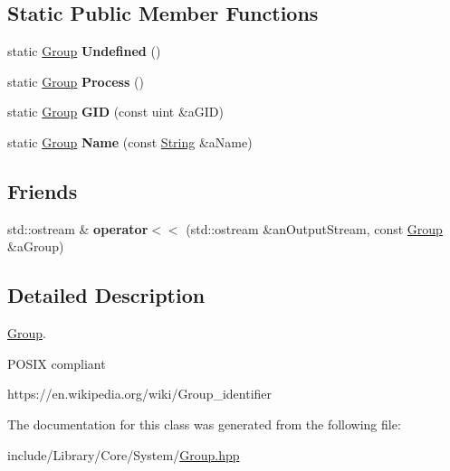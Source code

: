 \subsection*{Static Public Member Functions}
\begin{DoxyCompactItemize}
\item 
\mbox{\label{classlibrary_1_1core_1_1system_1_1_group_a50c939824e28f2ce5a0ff7ab253689e4}} 
static \hyperlink{classlibrary_1_1core_1_1system_1_1_group}{Group} {\bfseries Undefined} ()
\item 
\mbox{\label{classlibrary_1_1core_1_1system_1_1_group_a90961dc55447dca842c5f0ea43778c18}} 
static \hyperlink{classlibrary_1_1core_1_1system_1_1_group}{Group} {\bfseries Process} ()
\item 
\mbox{\label{classlibrary_1_1core_1_1system_1_1_group_a6f6e71dd112ccb60347fa366e61cd4e9}} 
static \hyperlink{classlibrary_1_1core_1_1system_1_1_group}{Group} {\bfseries G\+ID} (const uint \&a\+G\+ID)
\item 
\mbox{\label{classlibrary_1_1core_1_1system_1_1_group_a81dda2a1d0e251b40dabbde24be380d1}} 
static \hyperlink{classlibrary_1_1core_1_1system_1_1_group}{Group} {\bfseries Name} (const \hyperlink{classlibrary_1_1core_1_1types_1_1_string}{String} \&a\+Name)
\end{DoxyCompactItemize}
\subsection*{Friends}
\begin{DoxyCompactItemize}
\item 
\mbox{\label{classlibrary_1_1core_1_1system_1_1_group_adae6b8468d9a0cf648a52c296c6db73a}} 
std\+::ostream \& {\bfseries operator$<$$<$} (std\+::ostream \&an\+Output\+Stream, const \hyperlink{classlibrary_1_1core_1_1system_1_1_group}{Group} \&a\+Group)
\end{DoxyCompactItemize}


\subsection{Detailed Description}
\hyperlink{classlibrary_1_1core_1_1system_1_1_group}{Group}. 

P\+O\+S\+IX compliant

https\+://en.wikipedia.\+org/wiki/\+Group\+\_\+identifier 

The documentation for this class was generated from the following file\+:\begin{DoxyCompactItemize}
\item 
include/\+Library/\+Core/\+System/\hyperlink{_group_8hpp}{Group.\+hpp}\end{DoxyCompactItemize}
